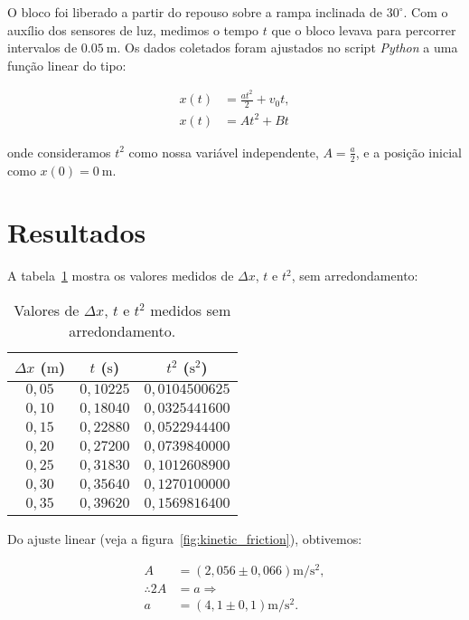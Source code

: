 \documentclass[10pt,oneside,twocolumn,a4paper]{article} %
\begin{document}
O bloco foi liberado a partir do repouso sobre a rampa inclinada de $30^\circ$.
Com o auxílio dos sensores de luz, medimos o tempo $t$ que o bloco levava para
percorrer intervalos de $\SI{0,05}{\metre}$. Os dados coletados foram ajustados
no script \textit{Python} a uma função linear do tipo:

\begin{align}
	x(t) &= \frac{at^2}{2} + v_0t, \nonumber \\
	x(t) &= At^2 + Bt
\end{align}

onde consideramos $t^2$ como nossa variável independente, $A = \frac{a}{2}$, e
a posição inicial como $x(0) = \SI{0}{\meter}$.

\section{Resultados}

A tabela~\ref{tbl:dados} mostra os valores medidos de $\Delta x$, $t$ e
$t^2$, sem arredondamento:

\begin{table}[ht!]
	\centering
		\begin{tabular}{|| c | c | c ||}
		\hline
		$\Delta x$ ($\si{\metre}$) & $t$ ($\si{\second}$) & $t^2$ ($\si{\second^2}$) \\
		\hline\hline
		$0,05$ & $0,10225$ & $0,0104500625$ \\
		$0,10$ & $0,18040$ & $0,0325441600$ \\
		$0,15$ & $0,22880$ & $0,0522944400$ \\
		$0,20$ & $0,27200$ & $0,0739840000$ \\
		$0,25$ & $0,31830$ & $0,1012608900$ \\
		$0,30$ & $0,35640$ & $0,1270100000$ \\
		$0,35$ & $0,39620$ & $0,1569816400$ \\
		\hline
	\end{tabular}
	\caption{Valores de $\Delta x$, $t$ e $t^2$ medidos sem arredondamento.}
	\label{tbl:dados}
\end{table}

Do ajuste linear (veja a figura~\ref{fig:kinetic_friction}), obtivemos:

\begin{align}\label{eq:accel}
	A &= \left( 2,056 \pm 0,066 \right) \si{\metre\per\second\squared}, \nonumber \\
	\therefore 2A &= a \Rightarrow \nonumber \\
	a &= \left( 4,1 \pm 0,1 \right) \si{\metre\per\second\squared}.
\end{align}
\end{document}

